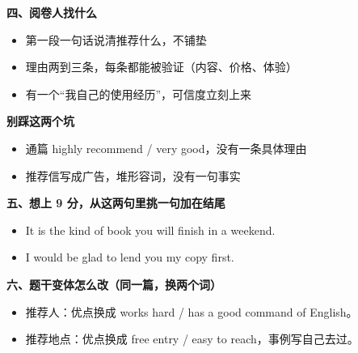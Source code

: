 \documentclass[11pt,a4paper]{ctexart}
\begin{document}
\vspace{5pt}
\noindent\begin{minipage}[t]{0.555\linewidth}
{\color{accent}\bfseries 四、阅卷人找什么}\par
{\footnotesize\begin{itemize}[leftmargin=1.2em,itemsep=1pt,topsep=1pt,parsep=0pt]\setlength{\leftmargin}{1.1em}
\item 第一段一句话说清推荐什么，不铺垫
\item 理由两到三条，每条都能被验证（内容、价格、体验）
\item 有一个“我自己的使用经历”，可信度立刻上来
\end{itemize}}
\end{minipage}\hfill
\begin{minipage}[t]{0.415\linewidth}
{\color{hot}\bfseries 别踩这两个坑}\par
{\footnotesize\begin{itemize}[leftmargin=1.2em,itemsep=1pt,topsep=1pt,parsep=0pt]\setlength{\leftmargin}{1.1em}
\item 通篇 highly recommend / very good，没有一条具体理由
\item 推荐信写成广告，堆形容词，没有一句事实
\end{itemize}}
\end{minipage}\par

\vspace{6pt}
{\color{accent}\bfseries 五、想上 9 分，从这两句里挑一句加在结尾}\par
\vspace{2pt}
{\footnotesize
\begin{itemize}[leftmargin=1.2em,itemsep=1.5pt,topsep=1pt,parsep=0pt]
\item It is the kind of book you will finish in a weekend.
\item I would be glad to lend you my copy first.
\end{itemize}}\par

\vspace{6pt}
{\color{accent}\bfseries 六、题干变体怎么改（同一篇，换两个词）}\par
\vspace{2pt}
{\footnotesize
\begin{itemize}[leftmargin=1.2em,itemsep=1.5pt,topsep=1pt,parsep=0pt]
\item 推荐人：优点换成 works hard / has a good command of English。
\item 推荐地点：优点换成 free entry / easy to reach，事例写自己去过。
\end{itemize}}\par
\end{document}
